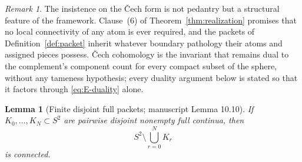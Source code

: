 \documentclass[11pt,reqno]{amsart}
\newtheorem{lemma}[theorem]{Lemma}
\theoremstyle{definition}
\theoremstyle{remark}
\newtheorem{remark}[theorem]{Remark}
\begin{document}
\begin{remark}\label{rem:E-cech}
The insistence on the \v{C}ech form is not pedantry but a structural feature of the
framework. Clause~(6) of Theorem~\ref{thm:realization} promises that no local
connectivity of any atom is ever required, and the packets of
Definition~\ref{def:packet} inherit whatever boundary pathology their atoms and
assigned pieces possess. \v{C}ech cohomology is the invariant that remains dual to
the complement's component count for every compact subset of the sphere, without any
tameness hypothesis; every duality argument below is stated so that it factors
through \eqref{eq:E-duality} alone.
\end{remark}

\begin{lemma}[Finite disjoint full packets; manuscript Lemma 10.10]\label{lem:packets}
If $K_0,\dots,K_N\subset S^2$ are pairwise disjoint nonempty full continua, then
\[
S^2\setminus\bigcup_{r=0}^{N}K_r
\]
is connected.
\end{lemma}
\end{document}
